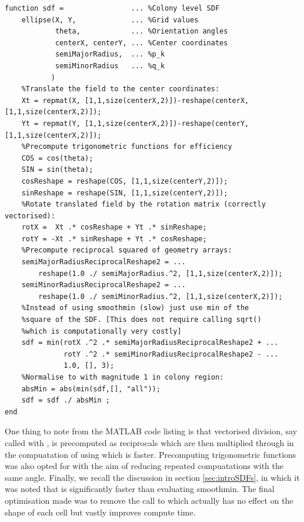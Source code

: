 \begin{lstlisting}[style=Matlab-editor,  
                   caption={A code listing for the \textbf{ellipse.m} script},
                   label={lst:ellipse}]
function sdf =                ... %Colony level SDF
    ellipse(X, Y,             ... %Grid values
            theta,            ... %Orientation angles
            centerX, centerY, ... %Center coordinates
            semiMajorRadius,  ... %p_k
            semiMinorRadius   ... %q_k       
           ) 
    %Translate the field to the center coordinates:
    Xt = repmat(X, [1,1,size(centerX,2)])-reshape(centerX, [1,1,size(centerX,2)]);
    Yt = repmat(Y, [1,1,size(centerX,2)])-reshape(centerY, [1,1,size(centerX,2)]);
    %Precompute trigonometric functions for efficiency
    COS = cos(theta);
    SIN = sin(theta);
    cosReshape = reshape(COS, [1,1,size(centerY,2)]);
    sinReshape = reshape(SIN, [1,1,size(centerY,2)]);
    %Rotate translated field by the rotation matrix (correctly vectorised):
    rotX =  Xt .* cosReshape + Yt .* sinReshape; 
    rotY = -Xt .* sinReshape + Yt .* cosReshape;
    %Precompute reciprocal squared of geometry arrays:
    semiMajorRadiusReciprocalReshape2 = ... 
        reshape(1.0 ./ semiMajorRadius.^2, [1,1,size(centerX,2)]);
    semiMinorRadiusReciprocalReshape2 = ...
        reshape(1.0 ./ semiMinorRadius.^2, [1,1,size(centerX,2)]);
    %Instead of using smoothmin (slow) just use min of the
    %square of the SDF. [This does not require calling sqrt() 
    %which is computationally very costly]
    sdf = min(rotX .^2 .* semiMajorRadiusReciprocalReshape2 + ...
              rotY .^2 .* semiMinorRadiusReciprocalReshape2 - ... 
              1.0, [], 3);
    %Normalise to with magnitude 1 in colony region:
    absMin = abs(min(sdf,[], "all"));
    sdf = sdf ./ absMin ;
end    
\end{lstlisting}

One thing to note from the MATLAB code listing is that 
vectorised division, say called with , 
is precomputed as reciprocals which 
are then multiplied through in the compuatation of  using  which is 
faster. Precomputing trigonometric functions was also opted for with 
the aim of reducing repeated compuatations with the same angle. 
Finally, we recall the discussion in section \ref{sec:introSDFs}, in which 
it was noted that  is significantly faster than evaluating smoothmin. 
The final optimisation made was to remove the call to  which  
actually has no effect on the shape of each cell but vastly improves
compute time.


